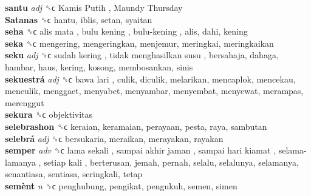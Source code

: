 \textbf{santu} \emph{adj}  ␝ϲ   Kamis Putih ,  Maundy Thursday   \\
\textbf{Satanas} ␝ϲ  hantu, iblis, setan, syaitan  \\
\textbf{seha} ␝ϲ   alis mata ,  bulu kening ,  bulu-kening , alis, dahi, kening  \\
\textbf{seka} ␝ϲ  mengering, mengeringkan, menjemur, meringkai, meringkaikan  \\
\textbf{seku} \emph{adj}  ␝ϲ   sudah kering ,  tidak menghasilkan susu , bersahaja, dahaga, hambar, haus, kering, kosong, membosankan, sinis  \\
\textbf{sekuestrá} \emph{adj}  ␝ϲ   bawa lari , culik, diculik, melarikan, mencaplok, mencekau, menculik, menggaet, menyabet, menyambar, menyembat, menyewat, merampas, merenggut  \\
\textbf{sekura} ␝ϲ  objektivitas  \\
\textbf{selebrashon} ␝ϲ  keraian, keramaian, perayaan, pesta, raya, sambutan  \\
\textbf{selebrá} \emph{adj}  ␝ϲ  bersukaria, meraikan, merayakan, rayakan  \\
\textbf{semper} \emph{adv}  ␝ϲ   lama sekali ,  sampai akhir jaman ,  sampai hari kiamat ,  selama-lamanya ,  setiap kali , berterusan, jemah, pernah, selalu, selalunya, selamanya, senantiasa, sentiasa, seringkali, tetap  \\
\textbf{semènt} \emph{n}  ␝ϲ  penghubung, pengikat, pengukuh, semen, simen  \\
